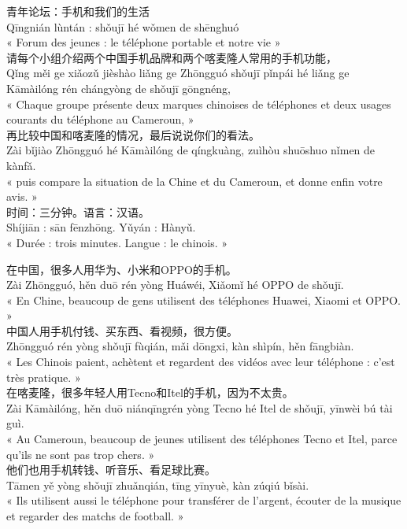 \documentclass[11pt]{article}
\begin{document}
\begin{textebox}
青年论坛：手机和我们的生活\\
Qīngnián lùntán : shǒujī hé wǒmen de shēnghuó\\
« Forum des jeunes : le téléphone portable et notre vie »\\[4pt]
请每个小组介绍两个中国手机品牌和两个喀麦隆人常用的手机功能，\\
Qǐng měi ge xiǎozǔ jièshào liǎng ge Zhōngguó shǒujī pǐnpái hé liǎng ge Kāmàilóng rén chángyòng de shǒujī gōngnéng,\\
« Chaque groupe présente deux marques chinoises de téléphones et deux usages courants du téléphone au Cameroun, »\\
再比较中国和喀麦隆的情况，最后说说你们的看法。\\
Zài bǐjiào Zhōngguó hé Kāmàilóng de qíngkuàng, zuìhòu shuōshuo nǐmen de kànfǎ.\\
« puis compare la situation de la Chine et du Cameroun, et donne enfin votre avis. »\\[4pt]
时间：三分钟。语言：汉语。\\
Shíjiān : sān fēnzhōng. Yǔyán : Hànyǔ.\\
« Durée : trois minutes. Langue : le chinois. »
\end{textebox}

\begin{textebox}
在中国，很多人用华为、小米和OPPO的手机。\\
Zài Zhōngguó, hěn duō rén yòng Huáwéi, Xiǎomǐ hé OPPO de shǒujī.\\
« En Chine, beaucoup de gens utilisent des téléphones Huawei, Xiaomi et OPPO. »\\
中国人用手机付钱、买东西、看视频，很方便。\\
Zhōngguó rén yòng shǒujī fùqián, mǎi dōngxi, kàn shìpín, hěn fāngbiàn.\\
« Les Chinois paient, achètent et regardent des vidéos avec leur téléphone : c'est très pratique. »\\
在喀麦隆，很多年轻人用Tecno和Itel的手机，因为不太贵。\\
Zài Kāmàilóng, hěn duō niánqīngrén yòng Tecno hé Itel de shǒujī, yīnwèi bú tài guì.\\
« Au Cameroun, beaucoup de jeunes utilisent des téléphones Tecno et Itel, parce qu'ils ne sont pas trop chers. »\\
他们也用手机转钱、听音乐、看足球比赛。\\
Tāmen yě yòng shǒujī zhuǎnqián, tīng yīnyuè, kàn zúqiú bǐsài.\\
« Ils utilisent aussi le téléphone pour transférer de l'argent, écouter de la musique et regarder des matchs de football. »
\end{textebox}
\end{document}
